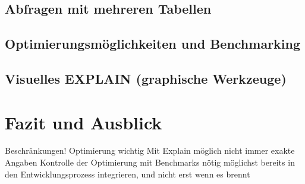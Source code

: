 \subsection{Abfragen mit mehreren Tabellen}
\subsection{Optimierungsmöglichkeiten und Benchmarking}
\subsection{Visuelles EXPLAIN (graphische Werkzeuge)}

\section{Fazit und Ausblick}

Beschränkungen!
Optimierung wichtig
Mit Explain möglich
nicht immer exakte Angaben
Kontrolle der Optimierung mit Benchmarks nötig
möglichst bereits in den Entwicklungsprozess integrieren, und nicht erst wenn es brennt
